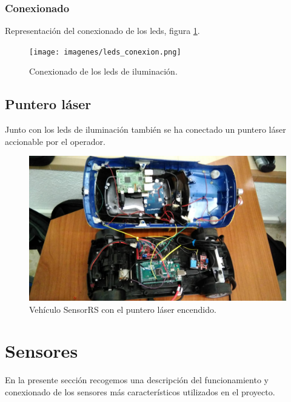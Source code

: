 \subsubsection{Conexionado}

Representación del conexionado de los leds, figura \ref{img:leds_conexiones}.\\

\begin{figure}[H]
  \begin{center}
   \texttt{[image: imagenes/leds\_conexion.png]}
  \end{center}
  \caption{Conexionado de los leds de iluminación.}
  \label{img:leds_conexiones}
\end{figure}


\subsection{Puntero láser}

Junto con los leds de iluminación también se ha conectado un puntero láser accionable por el operador.

\begin{figure}[H]
  \begin{center}
   \includegraphics[scale=0.2]{imagenes/robot/conexionado_general.jpeg}
  \end{center}
  \caption{Vehículo SensorRS con el puntero láser encendido.}
  \label{vista-conexiones}
\end{figure}


\section{Sensores}

En la presente sección recogemos una descripción del funcionamiento y conexionado de los sensores más característicos utilizados en el proyecto.\\

